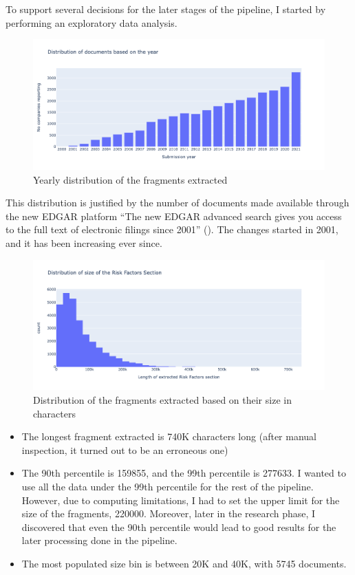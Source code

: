\documentclass[12pt,MSc,a4paper,oneside]{muthesis}
\begin{document}
To support several decisions for the later stages of the pipeline, I started by performing an exploratory data analysis.
\begin{figure}[h]
  \centering
  \includegraphics[scale=0.4]{dataset_analysis/Yearly Distribution document.png}
  \caption{Yearly distribution of the fragments extracted}
\end{figure}

This distribution is justified by the number of documents made available through the new EDGAR platform “The new EDGAR advanced search gives you access to the full text of electronic filings since 2001” (\cite{edgar-search}). The changes started in 2001, and it has been increasing ever since.

\newpage

\begin{figure}[h]
  \centering
  \includegraphics[scale=0.5]{dataset_analysis/Distribution of size.png}
  \caption{Distribution of the fragments extracted based on their size in characters}
\end{figure}

\begin{itemize}
  \item The longest fragment extracted is 740K characters long (after manual inspection, it turned out to be an erroneous one)
  \item The 90th percentile is 159855, and the 99th percentile is 277633. I wanted to use all the data under the 99th percentile for the rest of the pipeline. However, due to computing limitations, I had to set the upper limit for the size of the fragments, 220000. Moreover, later in the research phase, I discovered that even the 90th percentile would lead to good results for the later processing done in the pipeline.
  \item  The most populated size bin is between 20K and 40K, with 5745 documents.
\end{itemize}
\end{document}
